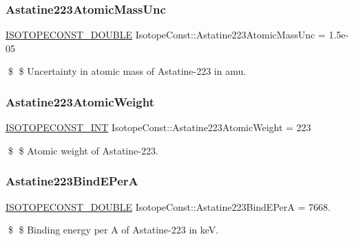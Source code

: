 \subsubsection{\texorpdfstring{Astatine223\+Atomic\+Mass\+Unc}{Astatine223AtomicMassUnc}}
{\footnotesize\ttfamily \mbox{\hyperlink{group___isotope_const-_macros_ga8f45a7272ce02c0b4c65c44636ed719a}{I\+S\+O\+T\+O\+P\+E\+C\+O\+N\+S\+T\+\_\+\+D\+O\+U\+B\+LE}} Isotope\+Const\+::\+Astatine223\+Atomic\+Mass\+Unc = 1.\+5e-\/05}

\$ \$ Uncertainty in atomic mass of Astatine-\/223 in amu. \mbox{\label{group___isotope_const-_astatine-_at223_gafc389a5df2039d90ca035bf5be03edb2}} 
\subsubsection{\texorpdfstring{Astatine223\+Atomic\+Weight}{Astatine223AtomicWeight}}
{\footnotesize\ttfamily \mbox{\hyperlink{group___isotope_const-_macros_ga5f18360b3e99483a35c32d789e62621c}{I\+S\+O\+T\+O\+P\+E\+C\+O\+N\+S\+T\+\_\+\+I\+NT}} Isotope\+Const\+::\+Astatine223\+Atomic\+Weight = 223}

\$ \$ Atomic weight of Astatine-\/223. \mbox{\label{group___isotope_const-_astatine-_at223_gafbcf6b95c6919be073f302b0d95d11a1}} 
\subsubsection{\texorpdfstring{Astatine223\+Bind\+E\+PerA}{Astatine223BindEPerA}}
{\footnotesize\ttfamily \mbox{\hyperlink{group___isotope_const-_macros_ga8f45a7272ce02c0b4c65c44636ed719a}{I\+S\+O\+T\+O\+P\+E\+C\+O\+N\+S\+T\+\_\+\+D\+O\+U\+B\+LE}} Isotope\+Const\+::\+Astatine223\+Bind\+E\+PerA = 7668.}

\$ \$ Binding energy per A of Astatine-\/223 in keV. \mbox{\label{group___isotope_const-_astatine-_at223_ga9c7086b2c4ae74f8a2e17b29c93db723}} 

